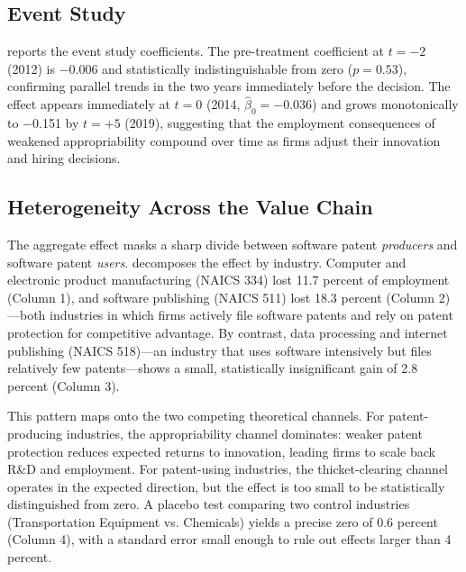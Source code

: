 \documentclass[12pt]{article}
\begin{document}


\subsection{Event Study}

 reports the event study coefficients. The pre-treatment coefficient at $t = -2$ (2012) is $-$0.006 and statistically indistinguishable from zero ($p = 0.53$), confirming parallel trends in the two years immediately before the decision. The effect appears immediately at $t = 0$ (2014, $\hat{\beta}_0 = -0.036$) and grows monotonically to $-$0.151 by $t = +5$ (2019), suggesting that the employment consequences of weakened appropriability compound over time as firms adjust their innovation and hiring decisions.



\subsection{Heterogeneity Across the Value Chain}

The aggregate effect masks a sharp divide between software patent \emph{producers} and software patent \emph{users}.  decomposes the effect by industry. Computer and electronic product manufacturing (NAICS 334) lost 11.7 percent of employment (Column 1), and software publishing (NAICS 511) lost 18.3 percent (Column 2)---both industries in which firms actively file software patents and rely on patent protection for competitive advantage. By contrast, data processing and internet publishing (NAICS 518)---an industry that uses software intensively but files relatively few patents---shows a small, statistically insignificant gain of 2.8 percent (Column 3).

This pattern maps onto the two competing theoretical channels. For patent-producing industries, the appropriability channel dominates: weaker patent protection reduces expected returns to innovation, leading firms to scale back R\&D and employment. For patent-using industries, the thicket-clearing channel operates in the expected direction, but the effect is too small to be statistically distinguished from zero. A placebo test comparing two control industries (Transportation Equipment vs. Chemicals) yields a precise zero of 0.6 percent (Column 4), with a standard error small enough to rule out effects larger than 4 percent.


\end{document}
